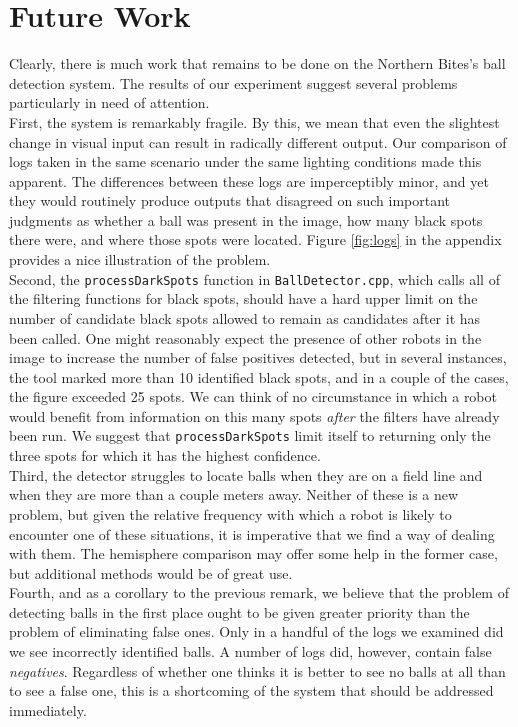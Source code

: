 \documentclass[11pt, twocolumn]{article}
\begin{document}
\section{Future Work}
Clearly, there is much work that remains to be done on the Northern Bites's ball detection system. The results of our experiment suggest several problems particularly in need of attention. \\
\indent First, the system is remarkably fragile. By this, we mean that even the slightest change in visual input can result in radically different output. Our comparison of logs taken in the same scenario under the same lighting conditions made this apparent. The differences between these logs are imperceptibly minor, and yet they would routinely produce outputs that disagreed on such important judgments as whether a ball was present in the image, how many black spots there were, and where those spots were located. Figure \ref{fig:logs} in the appendix provides a nice illustration of the problem. \\
\indent Second, the \texttt{processDarkSpots} function in \texttt{BallDetector.cpp}, which calls all of the filtering functions for black spots, should have a hard upper limit on the number of candidate black spots allowed to remain as candidates after it has been called. One might reasonably expect the presence of other robots in the image to increase the number of false positives detected, but in several instances, the tool marked more than 10 identified black spots, and in a couple of the cases, the figure exceeded 25 spots. We can think of no circumstance in which a robot would benefit from information on this many spots \emph{after} the filters have already been run. We suggest that \texttt{processDarkSpots} limit itself to returning only the three spots for which it has the highest confidence. \\
\indent Third, the detector struggles to locate balls when they are on a field line and when they are more than a couple meters away. Neither of these is a new problem, but given the relative frequency with which a robot is likely to encounter one of these situations, it is imperative that we find a way of dealing with them. The hemisphere comparison may offer some help in the former case, but additional methods would be of great use. \\
\indent Fourth, and as a corollary to the previous remark, we believe that the problem of detecting balls in the first place ought to be given greater priority than the problem of eliminating false ones. Only in a handful of the logs we examined did we see incorrectly identified balls. A number of logs did, however, contain false \emph{negatives}. Regardless of whether one thinks it is better to see no balls at all than to see a false one, this is a shortcoming of the system that should be addressed immediately.
\end{document}
